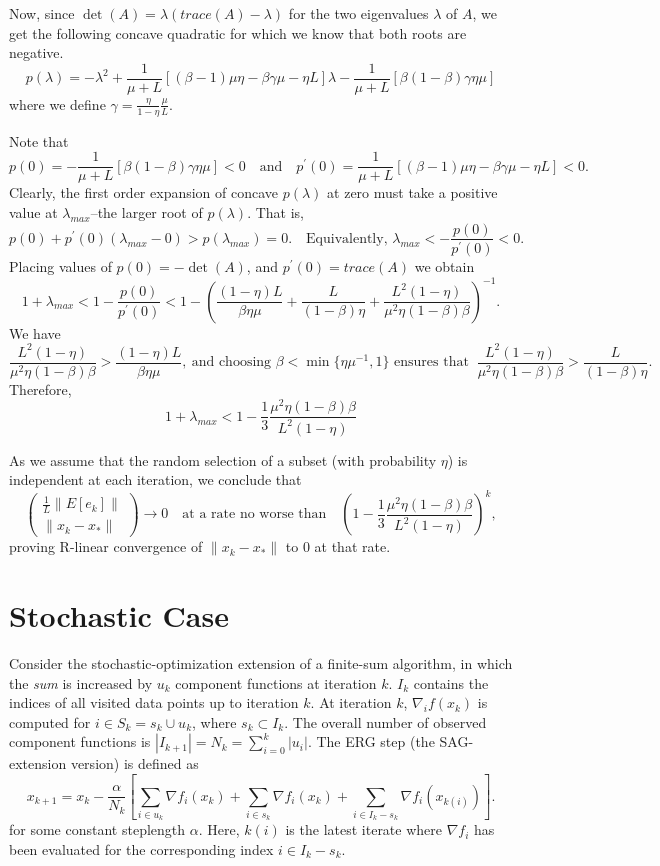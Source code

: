 \documentclass{article}
\begin{document}
Now, since $\det(A)=\lambda(trace(A)-\lambda)$ for the two eigenvalues $\lambda$ of $A$, we get the following concave quadratic for which we know that both roots are negative.
\[
 p(\lambda) = -\lambda^2 + \frac{1}{\mu+L}[(\beta-1)\mu\eta-\beta\gamma\mu-\eta L]\lambda - \frac{1}{\mu+L}[\beta(1-\beta)\gamma\eta\mu]
\]
where we define $\gamma = \frac{\eta}{1-\eta}\frac{\mu}{L}$.

Note that 
\[
 p(0)=-\frac{1}{\mu+L}[\beta(1-\beta)\gamma\eta\mu] < 0 \quad \mbox{and} \quad p^\prime(0) = \frac{1}{\mu+L}[(\beta-1)\mu\eta-\beta\gamma\mu-\eta L] < 0.
\]
Clearly, the first order expansion of concave $p(\lambda)$ at zero must take a positive value at $\lambda_{max}$--the larger root of $p(\lambda)$.  That is,
\[
 p(0)+p^\prime(0) (\lambda_{max}-0) > p(\lambda_{max})=0. \quad \mbox{Equivalently, } \lambda_{max}<-\frac{p(0)}{p^\prime(0)}<0.
\]
Placing values of $p(0)=-\det(A)$, and $p^\prime(0)=trace(A)$ we obtain
\[
 1+\lambda_{max}<1-\frac{p(0)}{p^\prime(0)}<1-\left(\frac{(1-\eta)L}{\beta\eta\mu}+\frac{L}{(1-\beta)\eta}+\frac{L^2(1-\eta)}{\mu^2\eta(1-\beta)\beta}\right)^{-1}.
\]
We have 
\[
\frac{L^2(1-\eta)}{\mu^2\eta(1-\beta)\beta} > \frac{(1-\eta)L}{\beta\eta\mu}, 
\ \mbox{and choosing $\beta<\min\{\eta\mu^{-1},1\}$ ensures that } \ \frac{L^2(1-\eta)}{\mu^2\eta(1-\beta)\beta}>\frac{L}{(1-\beta)\eta}.
\]
Therefore,
\[
 1+\lambda_{max}<1-\frac{1}{3}\frac{\mu^2\eta(1-\beta)\beta}{L^2(1-\eta)}
\]

\bigskip

As we assume that the random selection of a subset (with probability $\eta$) is independent at each iteration, we conclude that 
\[
 \begin{pmatrix} \displaystyle\frac{1}{L}\|E[e_k]\| \\
  \|x_k-x_\ast\|
 \end{pmatrix} \rightarrow 0 \quad \mbox{at a rate no worse than} \quad \left(1-\frac{1}{3}\frac{\mu^2\eta(1-\beta)\beta}{L^2(1-\eta)}\right)^k,
\]
proving R-linear convergence of $\|x_k-x_\ast\|$ to 0 at that rate.

\bigskip\bigskip

\section{Stochastic Case}

Consider the stochastic-optimization extension of a finite-sum algorithm, in which the \emph{sum} is increased by $u_k$ component functions at iteration $k$.  $I_k$ contains the indices of all visited data points up to iteration $k$.  At iteration $k$, $\nabla_i f(x_k)$ is computed for $i \in S_k = s_k\cup u_k$, where $s_k\subset I_k$.  The overall number of observed component functions is $|I_{k+1}|=N_k=\sum_{i=0}^k |u_i|$.  The ERG step (the SAG-extension version) is defined as 
 \[
  x_{k+1} = x_k - \frac{\alpha}{N_k}[\sum_{i\in u_k} \nabla f_i (x_k) + \sum_{i\in s_k} \nabla f_i (x_k) + \sum_{i\in I_k-s_k} \nabla f_i (x_{k(i)}) ].
 \]
for some constant steplength $\alpha$.  Here, $k(i)$ is the latest iterate where $\nabla f_i $ has been evaluated for the corresponding index $i\in I_k-s_k$.
\end{document}
